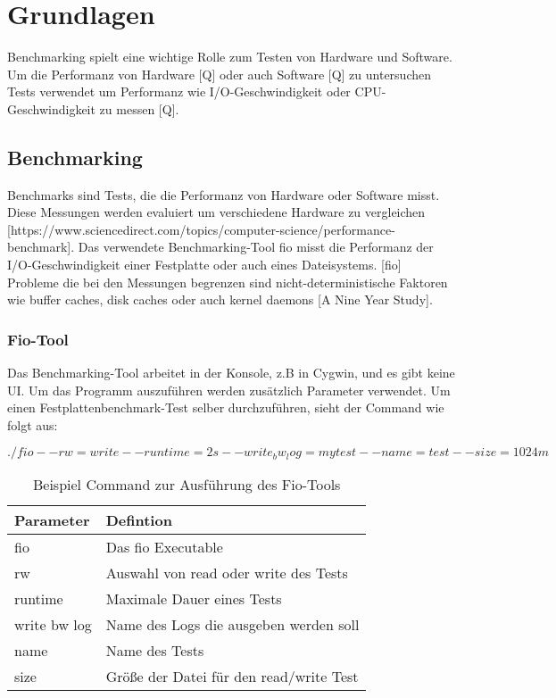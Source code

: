 \chapter{Grundlagen}
\label{cha:Grundlagen}
Benchmarking spielt eine wichtige Rolle zum Testen von Hardware und Software.
Um die Performanz von Hardware [Q] oder auch Software [Q] zu untersuchen Tests verwendet
um Performanz wie I/O-Geschwindigkeit oder CPU-Geschwindigkeit zu messen [Q].


\section{Benchmarking}

Benchmarks sind Tests, die die Performanz von Hardware oder Software misst. Diese Messungen werden evaluiert
um verschiedene Hardware zu vergleichen [https://www.sciencedirect.com/topics/computer-science/performance-benchmark].
Das verwendete Benchmarking-Tool fio misst die Performanz der I/O-Geschwindigkeit einer Festplatte oder auch eines Dateisystems. [fio]
Probleme die bei den Messungen begrenzen sind nicht-deterministische Faktoren wie buffer caches, disk caches oder auch kernel daemons [A Nine Year Study].

\subsection{Fio-Tool}
Das Benchmarking-Tool arbeitet in der Konsole, z.B in Cygwin, und es gibt keine UI.
Um das Programm auszuführen werden zusätzlich Parameter verwendet.
Um einen Festplattenbenchmark-Test selber durchzuführen, sieht der Command wie folgt aus:

$./fio --rw=write --runtime=2s --write_bw_log=mytest --name=test --size=1024m$

\begin{center}
  \begin{table}
    \begin{tabularx}{\textwidth}{|X|X|}
      \hline
        Parameter& Defintion \\ 
      \hline
      fio & Das fio Executable  \\ 
      \hline
      rw & Auswahl von read oder write des Tests  \\ 
      \hline
      runtime & Maximale Dauer eines Tests  \\ 
      \hline
      write bw log &  Name des Logs die ausgeben werden soll   \\ 
      \hline
      name &  Name des Tests   \\ 
      \hline
      size & Größe der Datei für den read/write Test    \\ 
      \hline
    \end{tabularx}
    \caption{Beispiel Command zur Ausführung des Fio-Tools}
    \label{tab:1d_1_sta}
  \end{table}
\end{center}

